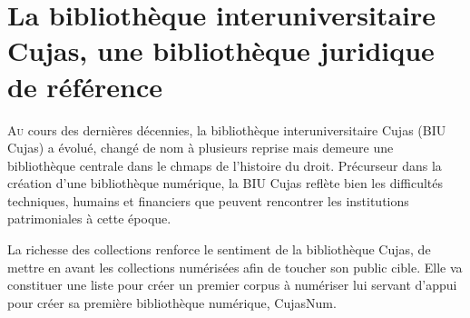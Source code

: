 \chapter[BIU Cujas]{La bibliothèque interuniversitaire Cujas, une bibliothèque juridique de référence}

\lettrine{A}u cours des dernières décennies, la bibliothèque interuniversitaire Cujas (BIU Cujas) a évolué, changé de nom à plusieurs reprise mais demeure une bibliothèque centrale dans le chmaps de l'histoire du droit. Précurseur dans la création d'une bibliothèque numérique, la BIU Cujas reflète bien les difficultés techniques, humains et financiers que peuvent rencontrer les institutions patrimoniales à cette époque.







La richesse des collections renforce le sentiment de la bibliothèque Cujas, de mettre en avant les collections numérisées afin de toucher son public cible. Elle va constituer une liste pour créer un premier corpus à numériser lui servant d'appui pour créer sa première bibliothèque numérique, CujasNum.